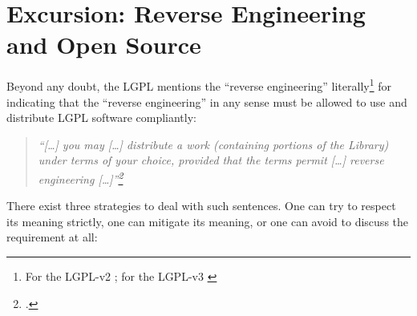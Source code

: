 %
%
%
%
%



\section{Excursion: Reverse Engineering and Open Source}

Beyond any doubt, the LGPL mentions the \enquote{reverse engineering}
literally\footnote{For the LGPL-v2 \cite[cf.][\nopage wp.
§6]{Lgpl21OsiLicense1999a}; for the LGPL-v3 \cite[cf.][\nopage wp.
§4]{Lgpl30OsiLicense2007a} } for indicating that the \enquote{reverse
engineering} in any sense must be allowed to use and distribute LGPL software
compliantly:

\begin{quote}\noindent\emph{\enquote{[\ldots] you may [\ldots] distribute a
work (containing portions of the Library) under terms of your choice, provided
that the terms permit [\ldots] \emph{reverse engineering}
[\ldots]}\footcite[cf.][\nopage wp, §6]{Lgpl21OsiLicense1999a}}
\end{quote}

There exist three strategies to deal with such sentences. One can try to respect
its meaning strictly, one can mitigate its meaning, or one can avoid to discuss
the requirement at all:


